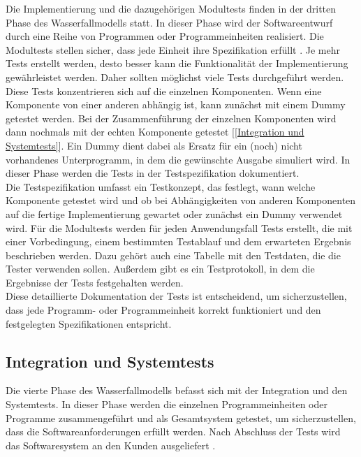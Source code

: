 Die Implementierung und die dazugehörigen Modultests finden in der dritten Phase des Wasserfallmodells statt. In dieser Phase wird der 
Softwareentwurf durch eine Reihe von Programmen oder Programmeinheiten realisiert. Die Modultests stellen sicher, dass jede Einheit ihre 
Spezifikation erfüllt \cite{Sommerville10}. Je mehr Tests erstellt werden, desto besser kann die Funktionalität der Implementierung gewährleistet 
werden. Daher sollten möglichst viele Tests durchgeführt werden. Diese Tests konzentrieren sich auf die einzelnen Komponenten. Wenn eine Komponente von 
einer anderen abhängig ist, kann zunächst mit einem Dummy getestet werden. Bei der Zusammenführung der einzelnen Komponenten wird dann nochmals mit der 
echten Komponente getestet [\autoref{Integration und Systemtests}]. Ein Dummy dient dabei als Ersatz für ein (noch) nicht vorhandenes Unterprogramm, in dem die gewünschte Ausgabe simuliert wird. 
In dieser Phase werden die Tests in der Testspezifikation dokumentiert.\\

Die Testspezifikation umfasst ein Testkonzept, das festlegt, wann welche Komponente getestet wird und ob bei Abhängigkeiten von anderen Komponenten auf 
die fertige Implementierung gewartet oder zunächst ein Dummy verwendet wird. Für die Modultests werden für jeden Anwendungsfall Tests erstellt, die mit einer 
Vorbedingung, einem bestimmten Testablauf und dem erwarteten Ergebnis beschrieben werden. Dazu gehört auch eine Tabelle mit den Testdaten, die die Tester 
verwenden sollen. Außerdem gibt es ein Testprotokoll, in dem die Ergebnisse der Tests festgehalten werden.\\

Diese detaillierte Dokumentation der Tests ist entscheidend, um sicherzustellen, dass jede Programm- oder Programmeinheit korrekt funktioniert und den 
festgelegten Spezifikationen entspricht.

\subsection{Integration und Systemtests}  \label{Integration und Systemtests}

Die vierte Phase des Wasserfallmodells befasst sich mit der Integration und den Systemtests. In dieser Phase werden die einzelnen Programmeinheiten oder 
Programme zusammengeführt und als Gesamtsystem getestet, um sicherzustellen, dass die Softwareanforderungen erfüllt werden. Nach Abschluss der Tests wird 
das Softwaresystem an den Kunden ausgeliefert \cite{Sommerville10}.\\

